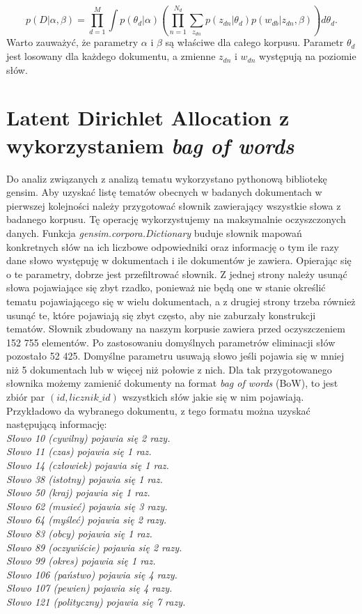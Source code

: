 \documentclass[a4paper,11pt,twoside]{report}
\theoremstyle{definition}
\begin{document}
\begin{equation}
p(D|\alpha,\beta) = \prod_{d=1}^M \int p(\theta_d |\alpha) \left(\prod_{n=1}^{N_d} \sum_{z_{dn}} p(z_{dn}|\theta_d)p(w_{db}|z_{dn}, \beta) \right) d\theta_d.
 \end{equation}
Warto zauważyć, że parametry $\alpha$ i $\beta$ są właściwe dla całego korpusu. Parametr $\theta_d$ jest losowany dla każdego dokumentu, a zmienne $z_{dn}$ i $w_{dn}$ występują na poziomie słów.

\section{Latent Dirichlet Allocation z wykorzystaniem \textit{bag of words}}
Do analiz związanych z analizą tematu wykorzystano pythonową bibliotekę gensim. 
Aby uzyskać listę tematów obecnych w badanych dokumentach w pierwszej kolejności należy przygotować słownik zawierający wszystkie słowa z badanego korpusu. Tę operację wykorzystujemy na maksymalnie oczyszczonych danych. Funkcja \textit{ gensim.corpora.Dictionary} buduje słownik mapowań konkretnych słów na ich liczbowe odpowiedniki oraz informację o tym ile razy dane słowo występuję w dokumentach i ile dokumentów je zawiera. Opierając się o te parametry, dobrze jest przefiltrować słownik. Z jednej strony należy usunąć słowa pojawiające się zbyt rzadko, ponieważ nie będą one w stanie określić tematu pojawiającego się w wielu dokumentach, a z drugiej strony trzeba również usunąć te, które pojawiają się zbyt często, aby nie zaburzały konstrukcji tematów.
Słownik zbudowany na naszym korpusie zawiera przed oczyszczeniem 152 755 elementów. Po zastosowaniu domyślnych parametrów eliminacji słów pozostało 52 425. Domyślne parametru usuwają słowo jeśli pojawia się w mniej niż 5 dokumentach lub w więcej niż połowie z nich.
Dla tak przygotowanego słownika możemy zamienić dokumenty na format \textit{bag of words} (BoW), to jest zbiór par $(id, licznik\_id)$ wszystkich słów jakie się w nim pojawiają. Przykładowo da wybranego dokumentu, z tego formatu można uzyskać następującą informację:\\
\textit{Słowo 10 (cywilny) pojawia się 2 razy.\\
Słowo 11 (czas) pojawia się 1 raz.\\
Słowo 14 (człowiek) pojawia się 1 raz.\\
Słowo 38 (istotny) pojawia się 1 raz.\\
Słowo 50 (kraj) pojawia się 1 raz.\\
Słowo 62 (musieć) pojawia się 3 razy.\\
Słowo 64 (myśleć) pojawia się 2 razy.\\
Słowo 83 (obcy) pojawia się 1 raz.\\
Słowo 89 (oczywiście) pojawia się 2 razy.\\
Słowo 99 (okres) pojawia się 1 raz.\\
Słowo 106 (państwo) pojawia się 4 razy.\\
Słowo 107 (pewien) pojawia się 4 razy.\\
Słowo 121 (polityczny) pojawia się 7 razy.}
\end{document}
